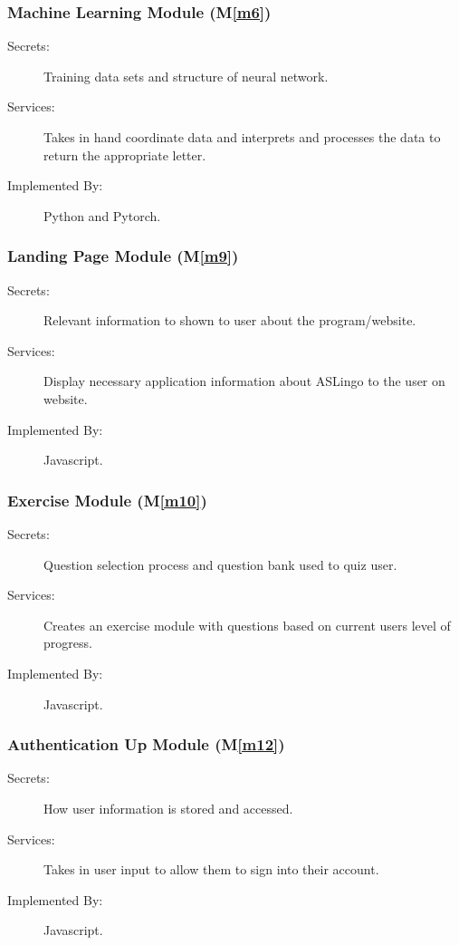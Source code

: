 \documentclass[12pt, titlepage]{article}
\newcommand{\mref}[1]{M\ref{#1}}
\begin{document}
\subsubsection{Machine Learning Module (\mref{m6})}
\begin{description}
\item[Secrets:] Training data sets and structure of neural network.
\item[Services:] Takes in hand coordinate data and interprets and processes the data to return the appropriate letter.
\item[Implemented By:] Python and Pytorch.
\end{description}

\subsubsection{Landing Page Module (\mref{m9})}
\begin{description}
\item[Secrets:] Relevant information to shown to user about the program/website.
\item[Services:] Display necessary application information about ASLingo to the user on website.
\item[Implemented By:] Javascript.
\end{description}

\subsubsection{Exercise Module (\mref{m10})}
\begin{description}
\item[Secrets:] Question selection process and question bank used to quiz user.
\item[Services:] Creates an exercise module with questions based on current users level of progress.
\item[Implemented By:] Javascript.
\end{description}

\subsubsection{Authentication Up Module (\mref{m12})}
\begin{description}
\item[Secrets:] How user information is stored and accessed.
\item[Services:] Takes in user input to allow them to sign into their account.
\item[Implemented By:] Javascript.
\end{description}
\end{document}
